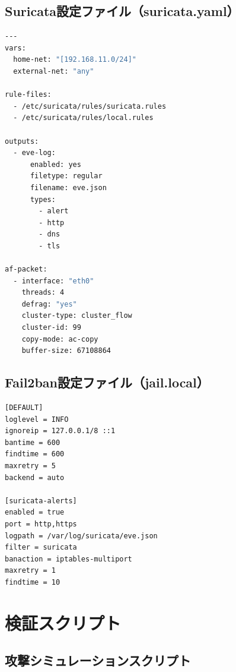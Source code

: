 \documentclass[12pt,a4paper]{article}
\begin{document}
\subsection{Suricata設定ファイル（suricata.yaml）}

\begin{lstlisting}[language=bash, caption=suricata.yaml]
%YAML 1.1
---
vars:
  home-net: "[192.168.11.0/24]"
  external-net: "any"

rule-files:
  - /etc/suricata/rules/suricata.rules
  - /etc/suricata/rules/local.rules

outputs:
  - eve-log:
      enabled: yes
      filetype: regular
      filename: eve.json
      types:
        - alert
        - http
        - dns
        - tls

af-packet:
  - interface: "eth0"
    threads: 4
    defrag: "yes"
    cluster-type: cluster_flow
    cluster-id: 99
    copy-mode: ac-copy
    buffer-size: 67108864
\end{lstlisting}

\subsection{Fail2ban設定ファイル（jail.local）}

\begin{lstlisting}[caption=jail.local]
[DEFAULT]
loglevel = INFO
ignoreip = 127.0.0.1/8 ::1
bantime = 600
findtime = 600
maxretry = 5
backend = auto

[suricata-alerts]
enabled = true
port = http,https
logpath = /var/log/suricata/eve.json
filter = suricata
banaction = iptables-multiport
maxretry = 1
findtime = 10
\end{lstlisting}

\section{検証スクリプト}

\subsection{攻撃シミュレーションスクリプト}
\end{document}
